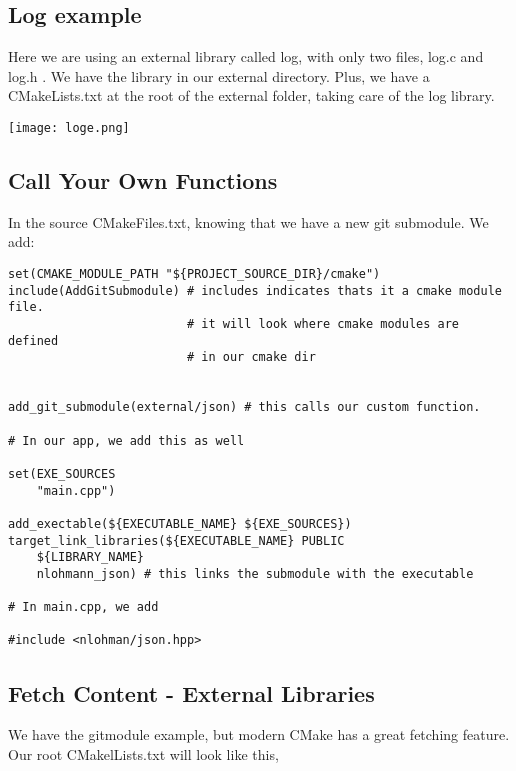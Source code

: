 \subsection{Log example}

Here we are using an external library called log, with only two files, log.c and log.h . We have the library in our 
external directory. Plus, we have a CMakeLists.txt at the root of the external folder, taking care of the log library. 


\begin{center}
    \texttt{[image: loge.png]}
\end{center}



\subsection{Call Your Own Functions}

In the source CMakeFiles.txt, knowing that we have a new git submodule. We add:


\begin{verbatim}
set(CMAKE_MODULE_PATH "${PROJECT_SOURCE_DIR}/cmake")
include(AddGitSubmodule) # includes indicates thats it a cmake module file.
                         # it will look where cmake modules are defined
                         # in our cmake dir


add_git_submodule(external/json) # this calls our custom function.

# In our app, we add this as well

set(EXE_SOURCES
    "main.cpp")

add_exectable(${EXECUTABLE_NAME} ${EXE_SOURCES})
target_link_libraries(${EXECUTABLE_NAME} PUBLIC
    ${LIBRARY_NAME}
    nlohmann_json) # this links the submodule with the executable

# In main.cpp, we add 

#include <nlohman/json.hpp>
\end{verbatim}


\subsection{Fetch Content - External Libraries}

We have the gitmodule example, but modern CMake has a great fetching feature. Our root CMakelLists.txt will look like this, 

